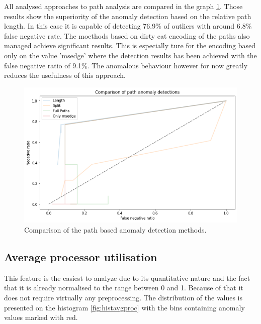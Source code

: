 \documentclass[a4paper,twoside,12pt]{book}
\begin{document}
All analysed approaches to path analysis are compared in the graph \ref{fig:pathcomp}. Those results show the
superiority of the anomaly detection based on the relative path length. In this case it is capable of detecting 
76.9\% of outliers with around 6.8\% false negative rate. The moethods based on dirty cat encoding of the paths also managed 
achieve significant results. This is especially ture for the encoding based only on the value 'msedge' where 
the detection results has been achieved with the false negative ratio of 9.1\%. The anomalous behaviour however for now
greatly reduces the usefulness of this approach.

\begin{figure}
	\centering
	\includegraphics[scale=0.9]{images/PathCompGraph2}
	\caption{Comparison of the path based anomaly detection methods.}
	\label{fig:pathcomp}
 \end{figure}

\subsection{Average processor utilisation}

This feature is the easiest to analyze due to its quantitative nature and the fact that it is
already normalised to the range between 0 and 1. Because of that it does not require virtually 
any preprocessing. The distribution of the values is presented on the 
histogram \ref{fig:histavgproc} with the bins containing anomaly values marked with red. 
\end{document}
